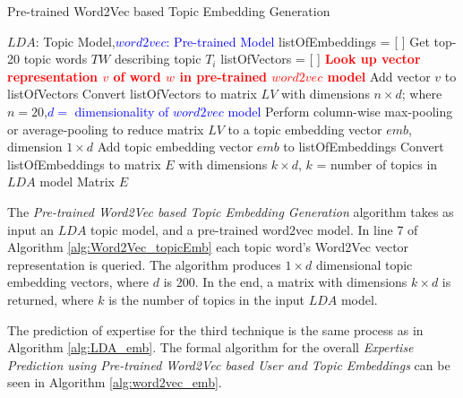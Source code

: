             \begin{algorithm}
            \caption{Pre-trained Word2Vec based Topic Embedding Generation}
            \label{alg:Word2Vec_topicEmb}
            \begin{algorithmic}[1]
                \REQUIRE $LDA$: Topic Model,\textcolor{blue}{$word2vec$: Pre-trained Model}
                \STATE listOfEmbeddings = [ ]
                    \STATE Get top-20 topic words $TW$ describing topic $T_i$
                    \STATE listOfVectors = [ ]
                    \STATE
                        \STATE \textbf{\textcolor{red}{Look up vector representation $v$ of word $w$ in pre-trained $word2vec$ model}}
                        \STATE Add vector $v$ to listOfVectors
                    \ENDFOR
                    \STATE Convert listOfVectors to matrix $LV$ with dimensions $n \times d$; where $n=20$,\textcolor{blue}{$d =$  dimensionality of $word2vec$ model}
                    \STATE Perform column-wise max-pooling or average-pooling to reduce matrix $LV$ to a topic embedding vector $emb$, dimension $1 \times d$
                    \STATE Add topic embedding vector $emb$ to listOfEmbeddings
                \ENDFOR
                \STATE Convert listOfEmbeddings to matrix $E$ with dimensions $k \times d$,  $k$ = number of topics in $LDA$ model
                \RETURN Matrix $E$
            \end{algorithmic}
            \end{algorithm}
            
            The \emph{Pre-trained Word2Vec based Topic Embedding Generation} algorithm takes as input an $LDA$ topic model, and a pre-trained word2vec model. In line 7 of Algorithm \ref{alg:Word2Vec_topicEmb} each topic word's Word2Vec vector representation is queried. The algorithm produces $1 \times d$ dimensional topic embedding vectors, where $d$ is 200. In the end, a matrix with dimensions $k \times d$ is returned, where $k$ is the number of topics in the input $LDA$ model.
            
            The prediction of expertise for the third technique is the same process as in Algorithm \ref{alg:LDA_emb}. The formal algorithm for the overall \emph{Expertise Prediction using Pre-trained Word2Vec based User and Topic Embeddings} can be seen in Algorithm \ref{alg:word2vec_emb}.
        
